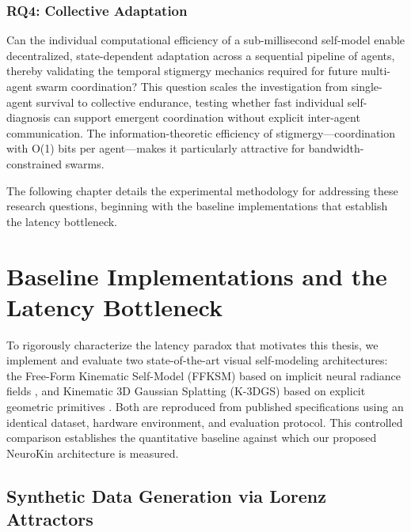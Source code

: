 ﻿\documentclass[12pt,a4paper,oneside]{report}
\begin{document}
\subsection{RQ4: Collective Adaptation}

Can the individual computational efficiency of a sub-millisecond self-model enable decentralized, state-dependent adaptation across a sequential pipeline of agents, thereby validating the temporal stigmergy mechanics required for future multi-agent swarm coordination? This question scales the investigation from single-agent survival to collective endurance, testing whether fast individual self-diagnosis can support emergent coordination without explicit inter-agent communication. The information-theoretic efficiency of stigmergy---coordination with O(1) bits per agent---makes it particularly attractive for bandwidth-constrained swarms.

The following chapter details the experimental methodology for addressing these research questions, beginning with the baseline implementations that establish the latency bottleneck.








\chapter{Baseline Implementations and the Latency Bottleneck}

To rigorously characterize the latency paradox that motivates this thesis, we implement and evaluate two state-of-the-art visual self-modeling architectures: the Free-Form Kinematic Self-Model (FFKSM) based on implicit neural radiance fields \cite{hu2024teaching}, and Kinematic 3D Gaussian Splatting (K-3DGS) based on explicit geometric primitives \cite{hu2025learning}. Both are reproduced from published specifications using an identical dataset, hardware environment, and evaluation protocol. This controlled comparison establishes the quantitative baseline against which our proposed NeuroKin architecture is measured.

\section{Synthetic Data Generation via Lorenz Attractors}
\end{document}
